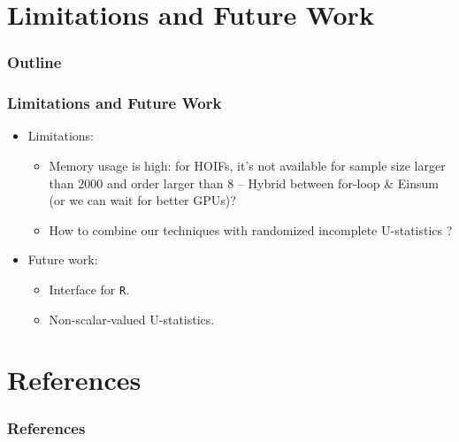 \documentclass[9pt]{beamer}
\theoremstyle{mystyle}
\theoremstyle{mystyletwo}
\begin{document}
\section{Limitations and Future Work}
\begin{frame}
    \frametitle{Outline}
    \tableofcontents[currentsection, sectionstyle=show/shaded, subsectionstyle=show/shaded/shaded]
\end{frame}
\begin{frame}
    \frametitle{Limitations and Future Work}
    \begin{itemize}
    \setlength\itemsep{1.5em}
        \item Limitations:
              \begin{itemize}
              \setlength\itemsep{1.5em}
                  \item Memory usage is high: for HOIFs, it's not available for sample size larger than $2000$ and order larger than $8$ -- Hybrid between for-loop \& Einsum (or we can wait for better GPUs)?

                  \item How to combine our techniques with randomized incomplete U-statistics \citep{chen2019randomized, shao2025u}?
              \end{itemize}
        \item Future work:
              \begin{itemize}
                  \item Interface for \texttt{R}.
                  \item Non-scalar-valued U-statistics.
              \end{itemize}
    \end{itemize}
\end{frame}

\section*{References}
\begin{frame}
    \frametitle{References}
    
\end{frame}
\end{document}
